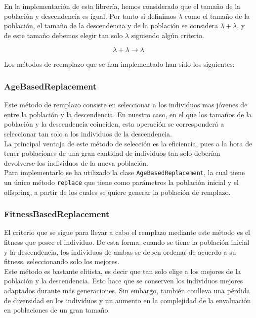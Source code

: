 En la implementación de esta librería, hemos considerado que el tamaño de la población y descendencia es igual. Por tanto si definimos $\lambda$ como el tamaño de la población, el tamaño de la descendencia y de la población se considera $\lambda + \lambda$, y de este tamaño debemos elegir tan solo $\lambda$ siguiendo algún criterio.

\begin{equation}
    \lambda + \lambda \rightarrow \lambda
\end{equation}

Los métodos de reemplazo que se han implementado han sido los siguientes:

\subsubsection{AgeBasedReplacement}

Este método de remplazo consiste en seleccionar a los individuos mas jóvenes de entre la población y la descendencia. En nuestro caso, en el que los tamaños de la población y la descendencia coinciden, esta operación se corresponderá a seleccionar tan solo a los individuos de la descendencia. \\

La principal ventaja de este método de selección es la eficiencia, pues a la hora de tener poblaciones de una gran cantidad de individuos tan solo deberían devolverse los individuos de la nueva población. \\

Para implementarlo se ha utilizado la clase \texttt{AgeBasedReplacement}, la cual tiene un único método \texttt{replace} que tiene como parámetros la población inicial y el offspring, a partir de los cuales se quiere generar la población de remplazo.

\subsubsection{FitnessBasedReplacement}

El criterio que se sigue para llevar a cabo el remplazo mediante este método es el fitness que posee el individuo. De esta forma, cuando se tiene la población inicial y la descendencia, los individuos de ambas se deben ordenar de acuerdo a su fitness, seleccionando solo los mejores. \\

Este método es bastante elitista, es decir que tan solo elige a los mejores de la población y la descendencia. Esto hace que se conserven los individuos mejores adaptados durante más generaciones. Sin embargo, también conlleva una pérdida de diversidad en los individuos y un aumento en la complejidad de la envaluación en poblaciones de un gran tamaño. \\

